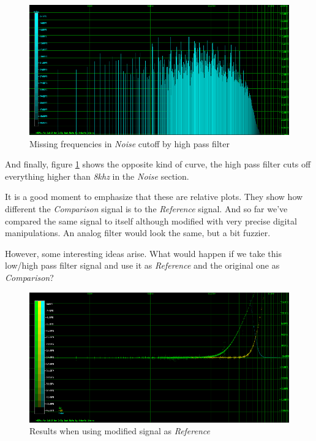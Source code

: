 \documentclass[10pt,a4paper]{report}
\begin{document}
\begin{figure}[H]
	\centering
	\includegraphics[width=1.0\linewidth]{plots/Plot4-6-Missing-Noise.png}
	\caption[Missing Noise]{Missing frequencies in \textit{Noise} cutoff by high pass filter}
	\label{fig:plot4-6-missing-noise}
\end{figure}

And finally, figure \ref{fig:plot4-6-missing-noise} shows the opposite kind of curve, the high pass filter cuts off everything higher than \textit{8khz} in the \textit{Noise} section.

It is a good moment to emphasize that these are relative plots. They show how different the \textit{Comparison} signal is to the \textit{Reference} signal. And so far we've compared the same signal to itself although modified with very precise digital manipulations. An analog filter would look the same, but a bit fuzzier. 

However, some interesting ideas arise. What would happen if we take this low/high pass filter signal and use it as \textit{Reference} and the original one as \textit{Comparison}?

\begin{figure}[H]
	\centering
	\includegraphics[width=1.0\linewidth]{plots/Plot4-7-Reversed.png}
	\caption[Reversed]{Results when using modified signal as \textit{Reference}}
	\label{fig:plot4-7-reversed}
\end{figure}
\end{document}
